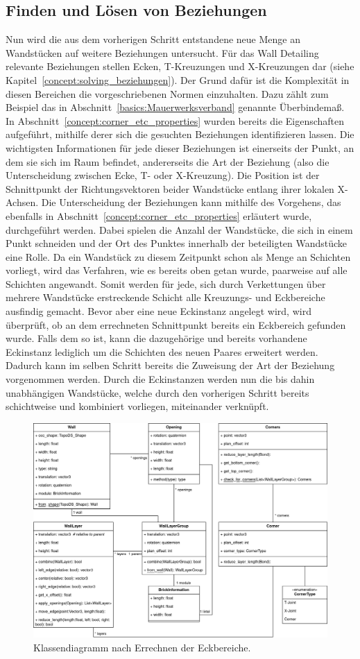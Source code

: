 \subsection{Finden und Lösen von Beziehungen}\label{real:find_and_solve}
Nun wird die aus dem vorherigen Schritt entstandene neue Menge an Wandstücken auf weitere Beziehungen untersucht.
Für das Wall Detailing relevante Beziehungen stellen Ecken, T-Kreuzungen und X-Kreuzungen dar (siehe Kapitel~\ref{concept:solving_beziehungen}).
Der Grund dafür ist die Komplexität in diesen Bereichen die vorgeschriebenen Normen einzuhalten.
Dazu zählt zum Beispiel das in Abschnitt~\ref{basics:Mauerwerksverband} genannte Überbindemaß.
In Abschnitt~\ref{concept:corner_etc_properties} wurden bereits die Eigenschaften aufgeführt, mithilfe derer sich die gesuchten Beziehungen identifizieren lassen.
Die wichtigsten Informationen für jede dieser Beziehungen ist einerseits der Punkt, an dem sie sich im Raum befindet, andererseits die Art der Beziehung (also die Unterscheidung zwischen Ecke, T- oder X-Kreuzung).
Die Position ist der Schnittpunkt der Richtungsvektoren beider Wandstücke entlang ihrer lokalen X-Achsen.
Die Unterscheidung der Beziehungen kann mithilfe des Vorgehens, das ebenfalls in Abschnitt~\ref{concept:corner_etc_properties} erläutert wurde, durchgeführt werden.
Dabei spielen die Anzahl der Wandstücke, die sich in einem Punkt schneiden und der Ort des Punktes innerhalb der beteiligten Wandstücke eine Rolle.
Da ein Wandstück zu diesem Zeitpunkt schon als Menge an Schichten vorliegt, wird das Verfahren, wie es bereits oben getan wurde, paarweise auf alle Schichten angewandt.
Somit werden für jede, sich durch Verkettungen über mehrere Wandstücke erstreckende Schicht alle Kreuzungs- und Eckbereiche ausfindig gemacht.
Bevor aber eine neue Eckinstanz angelegt wird, wird überprüft, ob an dem errechneten Schnittpunkt bereits ein Eckbereich gefunden wurde.
Falls dem so ist, kann die dazugehörige und bereits vorhandene Eckinstanz lediglich um die Schichten des neuen Paares erweitert werden.
Dadurch kann im selben Schritt bereits die Zuweisung der Art der Beziehung vorgenommen werden.
Durch die Eckinstanzen werden nun die bis dahin unabhängigen Wandstücke, welche durch den vorherigen Schritt bereits schichtweise und kombiniert vorliegen, miteinander verknüpft.
\begin{figure}[hb]
  \centering
  \includegraphics[width=0.8\columnwidth]{fig/klassendiagramm_corners.drawio.png}
  \caption{Klassendiagramm nach Errechnen der Eckbereiche.}
  \label{fig:real:class_diagram_corners}
\end{figure}
